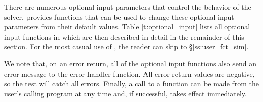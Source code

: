 {There are numerous optional input parameters that control the behavior
of the {\ida} solver.  {\ida} provides functions that can be used to change
these optional input parameters from their default values.
Table \ref{t:optional_input} lists all optional input functions in {\ida} which
are then described in detail in the remainder of this section.
For the most casual use of {\ida}, the reader can skip to \S\ref{ss:user_fct_sim}.

We note that, on an error return, all of the optional input functions also send an
error message to the error handler function.
All error return values are negative, so the test  will catch all
errors. Finally, a call to a  function can be made from the
user's calling program at any time and, if successful, takes effect immediately.

}
